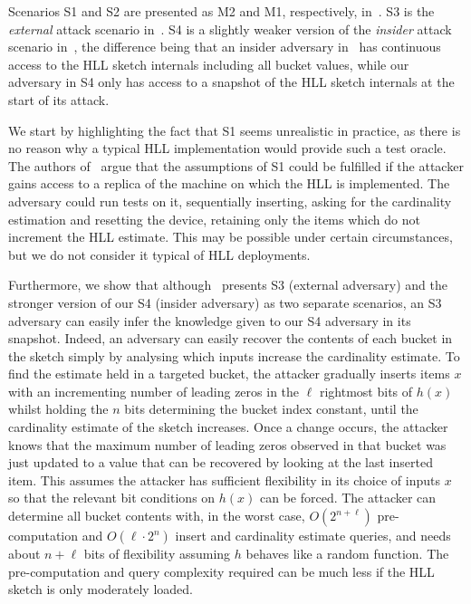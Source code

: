 \documentclass{IEEEtran}
\begin{document}
Scenarios S1 and S2 are presented as M2 and M1, respectively, in~\cite{hllvuln}. S3 is the \textit{external} attack scenario in~\cite{cardestprivacy}. S4 is a slightly weaker version of the \textit{insider} attack scenario in~\cite{cardestprivacy}, the difference being that an insider adversary in~\cite{cardestprivacy} has continuous access to the HLL sketch internals including all bucket values, while our adversary in S4 only has access to a snapshot of the HLL sketch internals at the start of its attack.

We start by highlighting the fact that S1 seems unrealistic in practice, as there is no reason why a typical HLL implementation would provide such a test oracle. The authors of~\cite{hllvuln} argue that the assumptions of S1 could be fulfilled if the attacker gains access to a replica of the machine on which the HLL is implemented. The adversary could run tests on it, sequentially inserting, asking for the cardinality estimation and resetting the device, retaining only the items which do not increment the HLL estimate. This may be possible under certain circumstances, but we do not consider it typical of HLL deployments.

Furthermore, we show that although~\cite{cardestprivacy} presents S3 (external adversary) and the stronger version of our S4 (insider adversary) as two separate scenarios, an S3 adversary can easily infer the knowledge given to our S4 adversary in its snapshot. Indeed, an adversary can easily recover the contents of each bucket in the sketch simply by analysing which inputs increase the cardinality estimate. To find the estimate held in a targeted bucket, the attacker gradually inserts items $x$ with an incrementing number of leading zeros in the $\ell$ rightmost bits of $h(x)$ whilst holding the $n$ bits determining the bucket index constant, until the cardinality estimate of the sketch increases. Once a change occurs, the attacker knows that the maximum number of leading zeros observed in that bucket was just updated to a value that can be recovered by looking at the last inserted item. This assumes the attacker has sufficient flexibility in its choice of inputs $x$ so that the relevant bit conditions on $h(x)$ can be forced. The attacker can determine all bucket contents with, in the worst case, $O(2^{n + \ell})$ pre-computation and $O(\ell \cdot 2^{n})$ insert and cardinality estimate queries, and needs about $n + \ell$ bits of flexibility assuming $h$ behaves like a random function. The pre-computation and query complexity required can be much less if the HLL sketch is only moderately loaded.
\end{document}
